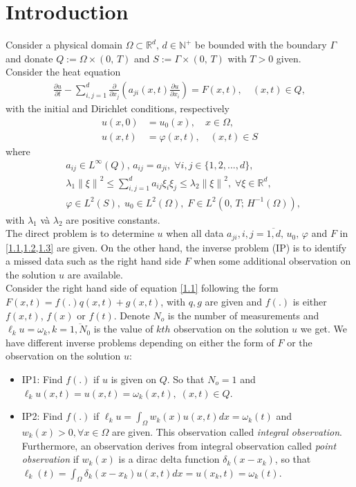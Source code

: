 \documentclass[]{article}
\begin{document}
\justifying

\thispagestyle{empty}

\newpage
\section{Introduction}
Consider a physical domain $\Omega \subset \mathbb{R}^d,\, d\in \mathbb{N^+}$ be bounded with the boundary $\Gamma$ and donate $Q:=\Omega\times (0,\, T)$ and $ S:=\Gamma \times (0,\, T)$ with $T>0$ given. 
\\
Consider the heat equation
\begin{align}\label{1.1}
	\frac{\partial u}{\partial t}-\sum_{i, j=1}^{d}\frac{\partial}{\partial x_j}\left(a_{ji}(x, t)\frac{\partial u}{\partial x_i}\right)=F(x, t), \quad(x, t)\in Q,
\end{align}
with the initial and Dirichlet conditions, respectively
\begin{align}
	u(x, 0)&=u_0(x),\quad x\in \Omega,\label{1.2}\\
	u(x, t)&=\varphi(x, t),\quad(x, t)\in S \label{1.3}
\end{align}
where
\begin{align*}
	&a_{ij}\in L^{\infty}(Q),\, a_{ij}=a_{ji},\; \forall i, j\in \{1, 2, ..., d\},\\
	&\lambda_1\left\|\xi\right\|^2\leq \sum_{i, j=1}^{d}a_{ij}\xi_i\xi_j\leq \lambda_2\left\|\xi\right\|^2,\; \forall \xi\in\mathbb{R}^d,\\
	&\varphi\in L^2(S),\; u_0\in L^2(\Omega),\; F\in L^2(0,\, T;\, H^{-1}(\Omega)),
\end{align*}
with $\lambda_1$ và $\lambda_2$ are positive constants.
\\
The direct problem is to determine $u$ when all data $a_{ji}, i, j=\overline{1, d}, \,u_0, \,\varphi$ and $F$ in \cref{1.1,1.2,1.3} are given. On the other hand, the inverse problem (IP) is to identify a missed data such as the right hand side $F$ when some additional observation on the solution $u$ are available. 
\\
Consider the right hand side of equation \eqref{1.1} following the form $F(x, t)=f(.)q(x, t)+g(x, t)$, with $q, g$ are given and $f(.)$ is either $f(x, t)$, $f(x)$ or $f(t)$. Denote $N_o$ is the number of measurements and $\ell_k u =\omega_k, k=\overline{1, N_0}$ is the value of $kth$ observation on the solution $u$ we get. We have different inverse problems depending on either the form of $F$ or the observation on the solution $u$: 
\begin{itemize}
	\item IP1: Find $f(.)$ if $u$ is given on $Q$. So that $N_o=1$ and $\ell_ku(x, t)=u(x, t)=\omega_k(x, t), \; (x, t)\in Q$.
	\item IP2: Find $f(.)$ if $\ell_ku=\int_\Omega w_k(x)u(x, t)dx=\omega_k(t)$ and $w_k(x)>0, \forall x\in \Omega$ are given. This observation called \textit{integral observation}. Furthermore, an observation derives from integral observation called \textit{point observation} if $w_k(x)$ is a dirac delta function $\delta_k(x-x_k)$, so that $\ell_k(t)=\int_\Omega\delta_k(x-x_k)u(x, t)dx=u(x_k, t)=\omega_k(t)$.
\end{itemize}
\end{document}
